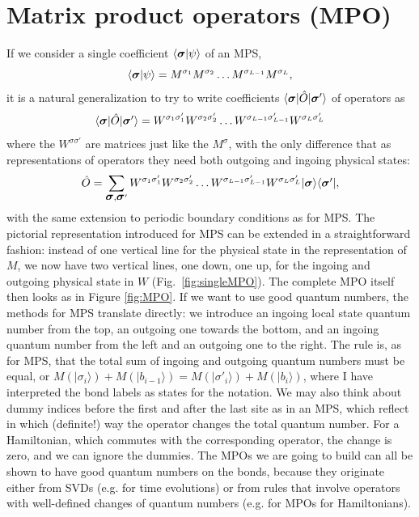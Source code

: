 \documentclass[a4paper,10pt,oneside,onecolumn,1p,times]{elsarticle}
\newcommand{\bra}[1]{\mbox{$\langle #1  |$}}
\newcommand{\ket}[1]{\mbox{$| #1  \rangle$}}
\newcommand{\braket}[2]{\mbox{$\langle #1  | #2 \rangle$}} 	%
\newcommand{\fat}[1]{\mbox{\boldmath$#1$\unboldmath}}	%
\begin{document}
\section{Matrix product operators (MPO)}
\label{sec:MPO}
If we consider a single coefficient $\braket{\fat{\sigma}}{\psi}$ of an MPS, 
\[
\braket{\fat{\sigma}}{\psi} = M^{\sigma_1}M^{\sigma_2}\ldots M^{\sigma_{L-1}}M^{\sigma_L},
\]
it is a natural generalization to try to write coefficients $\bra{\fat{\sigma}} \hat{O} \ket{\fat{\sigma}'}$ of operators as \cite{VerstraeteRipoll04,McCulloch07,VerstraetePirvu08,Crosswhite08,Frowis10}
\begin{equation}
\bra{\fat{\sigma}} \hat{O} \ket{\fat{\sigma}'} = W^{\sigma_1\sigma'_1}W^{\sigma_2\sigma'_2} \ldots
W^{\sigma_{L-1}\sigma'_{L-1}}W^{\sigma_L\sigma'_L}
\end{equation}
where the $W^{\sigma\sigma'}$ are matrices just like the $M^{\sigma}$, with the only difference that as representations of operators they need both outgoing and ingoing physical states:
\begin{equation}
\hat{O} = \sum_{\fat{\sigma},\fat{\sigma}'} W^{\sigma_1\sigma'_1}W^{\sigma_2\sigma'_2} \ldots
W^{\sigma_{L-1}\sigma'_{L-1}}W^{\sigma_L\sigma'_L} \ket{\fat{\sigma}}\bra{\fat{\sigma}'} ,
\label{eq:mpoform}
\end{equation}
with the same extension to periodic boundary conditions as for MPS. The pictorial representation introduced for MPS can be extended in a straightforward fashion: instead of one vertical line for the physical state in the representation of $M$, we now have two vertical lines, one down, one up, for the ingoing and outgoing physical state in $W$ (Fig.~\ref{fig:singleMPO}). The complete MPO itself then looks as in Figure \ref{fig:MPO}. If we want to use good quantum numbers, the methods for MPS translate directly: we introduce an ingoing local state quantum number from the top, an outgoing one towards the bottom, and an ingoing quantum number from the left and an outgoing one to the right. The rule is, as for MPS, that the total sum of ingoing and outgoing quantum numbers must be equal, or $M(\ket{\sigma_i}) + M(\ket{b_{i-1}}) = M(\ket{\sigma'_i}) + M(\ket{b_{i}})$, where I have interpreted the bond labels as states for the notation. We may also think about dummy indices before the first and after the last site as in an MPS, which reflect in which (definite!) way the operator changes the total quantum number. For a Hamiltonian, which commutes with the corresponding operator, the change is zero, and we can ignore the dummies. The MPOs we are going to build can all be shown to have good quantum numbers on the bonds, because they originate either from SVDs (e.g. for time evolutions) or from rules that involve operators with well-defined changes of quantum numbers (e.g. for MPOs for Hamiltonians).
\end{document}
